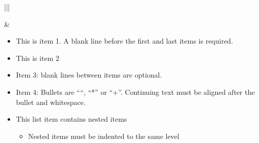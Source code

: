 \documentclass[letterpaper,10pt,english]{sphinxmanual}
\begin{document}
\begin{savenotes}\sphinxattablestart
\centering
\begin{tabular}[t]{|*{2}{|}}
\hline

\begin{sphinxVerbatimintable}[commandchars=\\\{\}]
          
      
    

        
        
         
   
      

          
\end{sphinxVerbatimintable}
&\begin{itemize}
\item {} 
This is item 1. A blank line before the first
and last items is required.

\item {} 
This is item 2

\item {} 
Item 3: blank lines between items are optional.

\item {} 
Item 4: Bullets are “\sphinxhyphen{}“, “*” or “+”.
Continuing text must be aligned after the bullet
and whitespace.

\item {} 
This list item contains nested items
\begin{itemize}
\item {} 
Nested items must be indented to the same
level


\end{itemize}
\end{itemize}
\end{tabular}
\end{savenotes}
\end{document}
